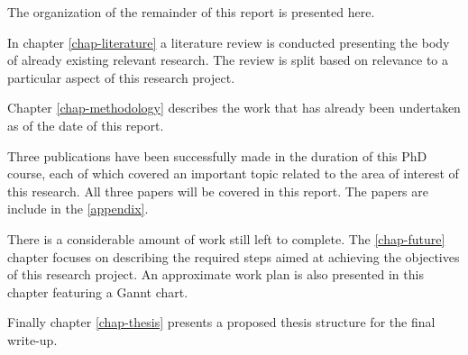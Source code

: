The organization of the remainder of this report is presented here.

In chapter \ref{chap-literature} a literature review is conducted  presenting the body of already existing relevant research. The review is split based on relevance to a particular aspect of this research project.

Chapter \ref{chap-methodology} describes the work that has already been undertaken as of the date of this report.

Three publications have been successfully made in the duration of this PhD course, each of which covered an important topic related to the area of interest of this research. All three papers will be covered in this report. The papers are include in the \ref{appendix}.

There is a considerable amount of work still left to complete. The \ref{chap-future} chapter focuses on describing the required steps aimed at achieving the objectives of this research project. An approximate work plan is also presented in this chapter featuring a Gannt chart.

Finally chapter \ref{chap-thesis} presents a proposed thesis structure for the final write-up.
